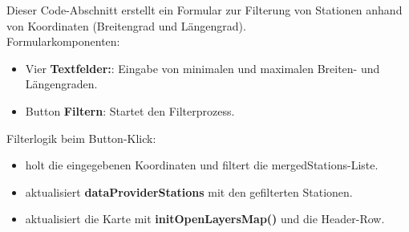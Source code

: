 \documentclass[a4paper,12pt]{scrreprt}
\begin{document}
Dieser Code-Abschnitt erstellt ein Formular zur Filterung von Stationen anhand von Koordinaten (Breitengrad und Längengrad).\\
Formularkomponenten:
\begin{itemize}
	\item Vier \textbf{Textfelder:}: Eingabe von minimalen und maximalen Breiten- und Längengraden.
	\item Button \textbf{Filtern}: Startet den Filterprozess.
\end{itemize}
Filterlogik beim Button-Klick:
\begin{itemize}
	\item holt die eingegebenen Koordinaten und filtert die mergedStations-Liste.
	\item aktualisiert \textbf{dataProviderStations} mit den gefilterten Stationen.
	\item aktualisiert die Karte mit \textbf{initOpenLayersMap()} und die Header-Row.
\end{itemize}
\end{document}
